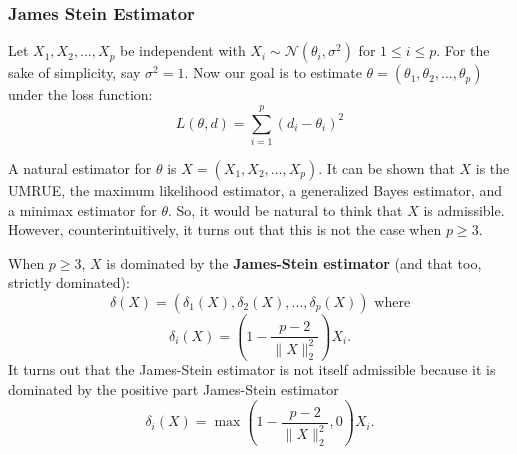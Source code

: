 \subsubsection{James Stein Estimator}
\begin{exam}
Let $X_1, X_2, \ldots, X_p$ be independent with $X_i \sim \mathcal{N}(\theta_i, \sigma^2)$ for $1 \leq i \leq p$. For the sake of simplicity, say $\sigma^2 = 1$. Now our goal is to estimate $\theta = (\theta_1, \theta_2, \ldots, \theta_p)$ under the loss function:
\[
L(\theta, d) = \sum_{i=1}^{p} (d_i - \theta_i)^2
\]

A natural estimator for $\theta$ is $X = (X_1, X_2, \ldots, X_p)$. It can be shown that $X$ is the UMRUE, the maximum likelihood estimator, a generalized Bayes estimator, and a minimax estimator for $\theta$. So, it would be natural to think that $X$ is admissible. However, counterintuitively, it turns out that this is not the case when $p \geq 3$.

When $p \geq 3$, $X$ is dominated by the \textbf{James-Stein estimator} (and that too, strictly dominated):
\[
\delta(X) = (\delta_1(X), \delta_2(X), \ldots, \delta_p(X)) \text{ where}
\]
\[
\delta_i(X) = \left(1 - \frac{p-2}{\|X\|_2^2}\right) X_i.
\]
It turns out that the James-Stein estimator is not itself admissible because it is dominated by the positive part James-Stein estimator
\[
\delta_i(X) = \max \left(
1 - \frac{p-2}{\|X\|_2^2}, 0
\right) X_i.
\]
\end{exam}
